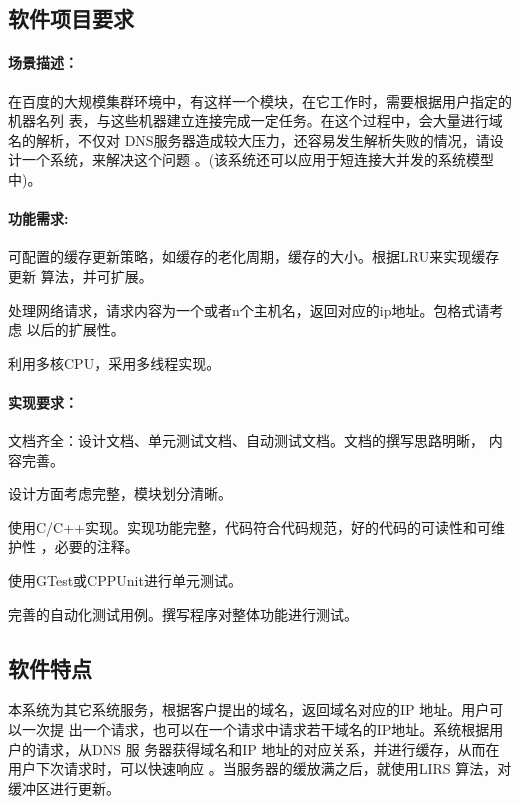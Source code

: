 \documentclass[12pt, a4paper, titlepage]{article}
\begin{document}
\subsection{软件项目要求}
\paragraph{场景描述：\\[7pt]}  

在百度的大规模集群环境中，有这样一个模块，在它工作时，需要根据用户指定的机器名列
表，与这些机器建立连接完成一定任务。在这个过程中，会大量进行域名的解析，不仅对
DNS服务器造成较大压力，还容易发生解析失败的情况，请设计一个系统，来解决这个问题
。(该系统还可以应用于短连接大并发的系统模型中)。

\paragraph{功能需求:}
\begin{asparaenum}
\item{可配置的缓存更新策略，如缓存的老化周期，缓存的大小。根据LRU来实现缓存更新
算法，并可扩展。}
\item{处理网络请求，请求内容为一个或者n个主机名，返回对应的ip地址。包格式请考虑
以后的扩展性。}
\item{利用多核CPU，采用多线程实现。}
\end{asparaenum}
\paragraph{实现要求：}
\begin{asparaenum}
\item{文档齐全：设计文档、单元测试文档、自动测试文档。文档的撰写思路明晰，
内容完善。}
\item{设计方面考虑完整，模块划分清晰。}
\item{使用C/C++实现。实现功能完整，代码符合代码规范，好的代码的可读性和可维护性
，必要的注释。}
\item{使用GTest或CPPUnit进行单元测试。}
\item{完善的自动化测试用例。撰写程序对整体功能进行测试。}
\end{asparaenum}

\subsection{软件特点}
本系统为其它系统服务，根据客户提出的域名，返回域名对应的IP 地址。用户可以一次提
出一个请求，也可以在一个请求中请求若干域名的IP地址。系统根据用户的请求，从DNS 服
务器获得域名和IP 地址的对应关系，并进行缓存，从而在用户下次请求时，可以快速响应
。当服务器的缓放满之后，就使用LIRS 算法，对缓冲区进行更新。
\end{document}
